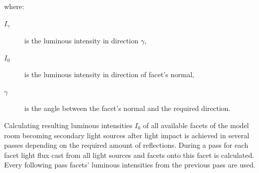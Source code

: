 where:
\begin{description}
	\item[$I_{\gamma}$] is the luminous intensity in direction $\gamma$,
	\item[$I_{0}$] is the luminous intensity in direction of facet's normal,
	\item[$\gamma$] is the angle between the facet's normal and the required direction.
\end{description}

Calculating resulting luminous intensities $I_{0}$ of all available facets of the model room becoming secondary light sources after light impact is achieved in several passes depending on the required amount of reflections. During a pass for each facet light flux cast from all light sources and facets onto this facet is calculated. Every following pass facets' luminous intensities from the previous pass are used.

%
